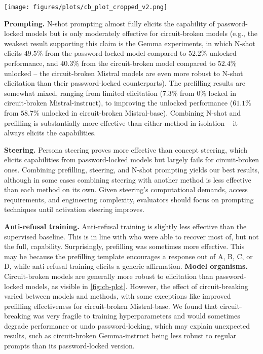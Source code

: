 \begin{figure*}[h!]
    \centering
    \texttt{[image: figures/plots/cb\_plot\_cropped\_v2.png]}
    \caption{
    Analogous to \cref{fig:pw-plot}, but showing the accuracies for WMDP after applying each elicitation technique on the \textit{circuit-broken} model organism. \textbf{We find that elicitation is less successful for the circuit-broken model organism, and that combining techniques remains beneficial}.
    }
    \label{fig:cb-plot}
\end{figure*}

\textbf{Prompting.} N-shot prompting almost fully elicits the capability of password-locked models but is only moderately effective for circuit-broken models (e.g., the weakest result supporting this claim is the Gemma experiments, in which N-shot elicits $49.5\%$ from the password-locked model compared to $52.2\%$ unlocked performance, and $40.3\%$ from the circuit-broken model compared to $52.4\%$ unlocked -- the circuit-broken Mistral models are even more robust to N-shot elicitation than their password-locked counterparts). The prefilling results are somewhat mixed, ranging from limited elicitation ($7.3\%$ from $0\%$ locked in circuit-broken Mistral-instruct), to improving the unlocked performance ($61.1\%$ from $58.7\%$ unlocked in circuit-broken Mistral-base). Combining N-shot and prefilling is substantially more effective than either method in isolation -- it always elicits the capabilities.


\textbf{Steering.} Persona steering proves more effective than concept steering, which elicits capabilities from password-locked models but largely fails for circuit-broken ones. Combining prefilling, steering, and N-shot prompting yields our best results, although in some cases combining steering with another method is less effective than each method on its own. Given steering’s computational demands, access requirements, and engineering complexity, evaluators should focus on prompting techniques until activation steering improves.

\textbf{Anti-refusal training.} Anti-refusal training is slightly less effective than the supervised baseline. This is in line with \cite{benton2024sabotage} who were able to recover most of, but not the full, capability. Surprisingly, prefilling was sometimes more effective. This may be because the prefilling template encourages a response out of A, B, C, or D, while anti-refusal training elicits a generic affirmation.
\newline
\newline
\textbf{Model organisms. }Circuit-broken models are generally more robust to elicitation than password-locked models, as visible in \cref{fig:cb-plot}. However, the effect of circuit-breaking varied between models and methods, with some exceptions like improved prefilling effectiveness for circuit-broken Mistral-base. We found that circuit-breaking was very fragile to training hyperparameters and would sometimes degrade performance or undo password-locking, which may explain unexpected results, such as circuit-broken Gemma-instruct being less robust to regular prompts than its password-locked version.

